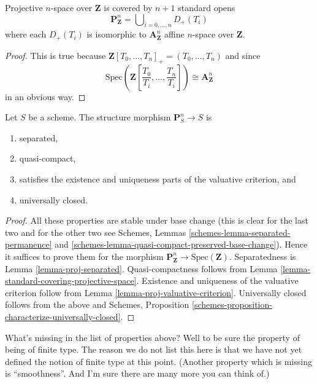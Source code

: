 \begin{lemma}
\label{lemma-standard-covering-projective-space}
Projective $n$-space over $\mathbf{Z}$ is covered by
$n + 1$ standard opens
$$
\mathbf{P}^n_{\mathbf{Z}} =
\bigcup\nolimits_{i = 0, \ldots, n} D_{+}(T_i)
$$
where each $D_{+}(T_i)$ is isomorphic to $\mathbf{A}^n_{\mathbf{Z}}$
affine $n$-space over $\mathbf{Z}$.
\end{lemma}

\begin{proof}
This is true because
$\mathbf{Z}[T_0, \ldots, T_n]_{+} = (T_0, \ldots, T_n)$ and
since
$$
\text{Spec}
\left(
\mathbf{Z}
\left[\frac{T_0}{T_i}, \ldots, \frac{T_n}{T_i}
\right]
\right)
\cong
\mathbf{A}^n_{\mathbf{Z}}
$$
in an obvious way.
\end{proof}

\begin{lemma}
\label{lemma-projective-space-separated}
Let $S$ be a scheme.
The structure morphism $\mathbf{P}^n_S \to S$ is
\begin{enumerate}
\item separated,
\item quasi-compact,
\item satisfies the existence and uniqueness parts of the valuative criterion,
and
\item universally closed.
\end{enumerate}
\end{lemma}

\begin{proof}
All these properties are stable under base change (this is clear for the
last two and for the other two see
Schemes, Lemmas
\ref{schemes-lemma-separated-permanence} and
\ref{schemes-lemma-quasi-compact-preserved-base-change}).
Hence it suffices to prove them for the morphism
$\mathbf{P}^n_{\mathbf{Z}} \to \text{Spec}(\mathbf{Z})$.
Separatedness is Lemma \ref{lemma-proj-separated}. Quasi-compactness follows
from Lemma \ref{lemma-standard-covering-projective-space}.
Existence and uniqueness of the valuative criterion follow from
Lemma \ref{lemma-proj-valuative-criterion}.
Universally closed follows from the above and
Schemes, Proposition \ref{schemes-proposition-characterize-universally-closed}.
\end{proof}

\begin{remark}
\label{remark-missing-finite-type}
What's missing in the list of properties above? Well to be sure the property
of being of finite type. The reason we do not list this here is that we have
not yet defined the notion of finite type at this point. (Another property
which is missing is ``smoothness''. And I'm sure there are many more you can
think of.)
\end{remark}

